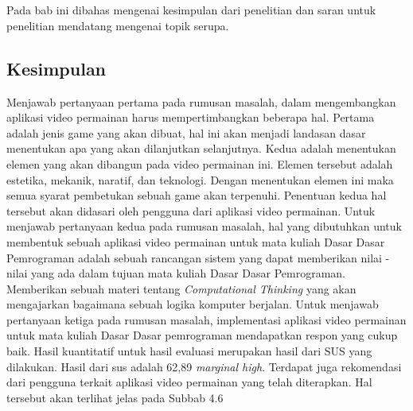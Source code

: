 \chapter{\babLima}
Pada bab ini dibahas mengenai kesimpulan dari penelitian dan saran untuk penelitian
mendatang mengenai topik serupa.
\section{Kesimpulan}
Menjawab pertanyaan pertama pada rumusan masalah, dalam mengembangkan aplikasi video permainan harus mempertimbangkan beberapa hal. Pertama adalah jenis game yang akan dibuat, hal ini akan menjadi landasan dasar menentukan apa yang akan dilanjutkan selanjutnya. Kedua adalah menentukan elemen yang akan dibangun pada video permainan ini. Elemen tersebut adalah estetika, mekanik, naratif, dan teknologi. Dengan menentukan elemen ini maka semua syarat pembetukan sebuah game akan terpenuhi. Penentuan kedua hal tersebut akan didasari oleh pengguna dari aplikasi video permainan.
\linebreak\linebreak
Untuk menjawab pertanyaan kedua pada rumusan masalah, hal yang dibutuhkan untuk membentuk sebuah aplikasi video permainan untuk mata kuliah Dasar Dasar Pemrograman adalah sebuah rancangan sistem yang dapat memberikan nilai - nilai yang ada dalam tujuan mata kuliah Dasar Dasar Pemrograman. Memberikan sebuah materi tentang \textit{Computational Thinking} yang akan mengajarkan bagaimana sebuah logika komputer berjalan.
Untuk menjawab pertanyaan ketiga pada rumusan masalah, implementasi aplikasi video permainan untuk mata kuliah Dasar Dasar pemrograman mendapatkan respon yang cukup baik. Hasil kuantitatif untuk hasil evaluasi merupakan hasil dari SUS yang dilakukan. Hasil dari sus adalah 62,89 \textit{marginal high}. Terdapat juga rekomendasi dari pengguna terkait aplikasi video permainan yang telah diterapkan. Hal tersebut akan terlihat jelas pada Subbab 4.6

